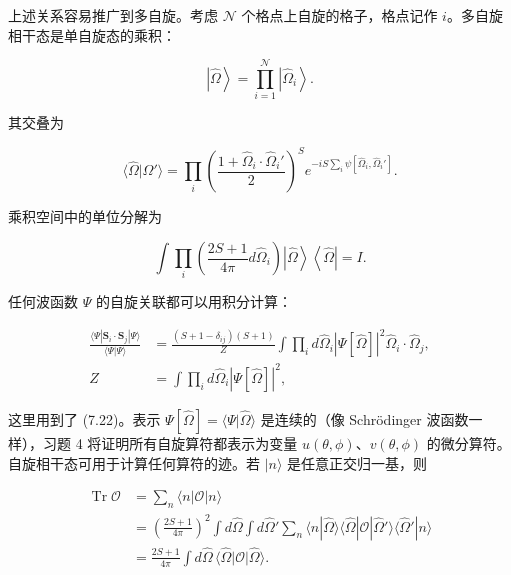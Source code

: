 上述关系容易推广到多自旋。考虑 $\mathcal{N}$ 个格点上自旋的格子，格点记作 $i$。多自旋相干态是单自旋态的乘积：

\begin{equation*}
\left| \hat {\Omega} \right\rangle = \prod_ {i = 1} ^ {\mathcal {N}} \left| \hat {\Omega} _ {i} \right\rangle .
\tag{7.23}
\end{equation*}

其交叠为

\begin{equation*}
\langle \hat {\Omega} | \hat {\Omega} ' \rangle = \prod_ {i} \left( \frac {1 + \hat {\Omega} _ {i} \cdot \hat {\Omega} _ {i} '}{2} \right) ^ {S} e ^ {- i S \sum_ {i} \psi [ \hat {\Omega} _ {i}, \hat {\Omega} _ {i} ' ]}.
\tag{7.24}
\end{equation*}

乘积空间中的单位分解为

\begin{equation*}
\int \prod_ {i} \left( \frac {2 S + 1}{4 \pi} d \hat {\Omega} _ {i} \right) \left| \hat {\Omega} \right\rangle \left\langle \hat {\Omega} \right| = I.
\tag{7.25}
\end{equation*}

任何波函数 $\Psi$ 的自旋关联都可以用积分计算：

\begin{align*}
\frac {\langle \Psi | \mathbf {S} _ {i} \cdot \mathbf {S} _ {j} | \Psi \rangle}{\langle \Psi | \Psi \rangle} & = \frac {( S + 1 - \delta_ {ij} ) ( S + 1 )}{Z} \int \prod_ {i} d \hat {\Omega} _ {i} \left| \Psi [ \hat {\Omega} ] \right| ^ {2} \hat {\Omega} _ {i} \cdot \hat {\Omega} _ {j} ,\\
Z & = \int \prod_ {i} d \hat {\Omega} _ {i} \left| \Psi [ \hat {\Omega} ] \right| ^ {2} ,
\tag{7.26}
\end{align*}

这里用到了 (7.22)。表示 $\Psi[\hat{\Omega}]=\langle\Psi|\hat{\Omega}\rangle$ 是连续的（像 Schrödinger 波函数一样），习题 4 将证明所有自旋算符都表示为变量 $u(\theta,\phi)$、$v(\theta,\phi)$ 的微分算符。自旋相干态可用于计算任何算符的迹。若 $|n\rangle$ 是任意正交归一基，则

\begin{align*}
\operatorname{Tr} \mathcal {O} & = \sum_ {n} \langle n | \mathcal {O} | n \rangle\\
& = \left( \frac {2 S + 1}{4 \pi} \right) ^ {2} \int d \hat {\Omega} \int d \hat {\Omega} ' \sum_ {n} \langle n | \hat {\Omega} \rangle \langle \hat {\Omega} | \mathcal {O} | \hat {\Omega} ' \rangle \langle \hat {\Omega} ' | n \rangle\\
& = \frac {2 S + 1}{4 \pi} \int d \hat {\Omega} \, \langle \hat {\Omega} | \mathcal {O} | \hat {\Omega} \rangle .
\tag{7.27}
\end{align*}

